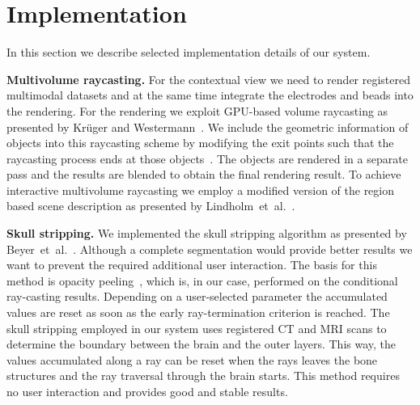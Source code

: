 \documentclass[review]{vgtc}                 %
\begin{document}

\section{Implementation}\label{sec:implementation}
In this section we describe selected implementation details of our system.

\noindent \textbf{Multivolume raycasting.} For the contextual view we need to render registered multimodal datasets and at the same time integrate the electrodes and beads into the rendering. For the rendering we exploit GPU-based volume raycasting as presented by Kr\"uger and Westermann~\cite{kr}. We include the geometric information of objects into this raycasting scheme by modifying the exit points such that the raycasting process ends at those objects~\cite{Scharsach}. The objects are rendered in a separate pass and the results are blended to obtain the final rendering result. To achieve interactive multivolume raycasting we employ a modified version of the region based scene description as presented by Lindholm~et~al.~\cite{Lindholm2009}.

\noindent \textbf{Skull stripping.} We implemented the skull stripping algorithm as presented by Beyer~et~al.~\cite{Beyer2007}. Although a complete segmentation would provide better results we want to prevent the required additional user interaction. The basis for this method is opacity peeling~\cite{Rezk-salama2006}, which is, in our case, performed on the conditional ray-casting results. Depending on a user-selected parameter the accumulated values are reset as soon as the early ray-termination criterion is reached. The skull stripping employed in our system uses registered CT and MRI scans to determine the boundary between the brain and the outer layers. This way, the values accumulated along a ray can be reset when the rays leaves the bone structures and the ray traversal through the brain starts. This method requires no user interaction and provides good and stable results.
\end{document}
